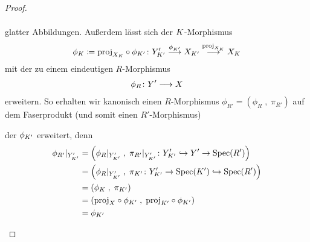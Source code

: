 \documentclass[german]{scrreprt}
\begin{document}
\begin{Satz}
\begin{proof}
\begin{enumerate}[label=(\roman*)]
\begin{description}
\begin{gather*}
        \end{gather*}
        glatter Abbildungen.
        Außerdem lässt sich der $K$-Morphismus
        \begin{gather*}
          \phi_{K} \coloneqq \text{proj}_{X_{K}}\circ\phi_{K'}
          \colon
          Y_{K'}' \overset{\phi_{K'}}{\longrightarrow} X_{K'}
          \overset{\text{proj}_{X_{K}}}{\longrightarrow} X_{K}
        \end{gather*}
        mit der \NAbbEig zu einem eindeutigen
        $R$-Morphismus
        \begin{gather*}
          \phi_R\colon Y'\longrightarrow X
        \end{gather*}
        erweitern.
        So erhalten wir kanonisch einen $R$-Morphismus
        $\phi_{R'} = (\phi_R\;,\;\pi_{R'})$ auf dem
        Faserprodukt (und somit einen $R'$-Morphismus)
        \begin{center}
        \end{center}
        der $\phi_{K'}$ erweitert, denn
        \begin{align*}
          \phi_{R'}|_{Y_{\K'}'}
          &= \left(
            \phi_R|_{Y_{\K'}'}\;,\;
            \pi_{R'}|_{Y_{\K'}'}\colon
            Y_{\K'}'\hookrightarrow Y'\to\Spec(R')
            \right)\\
          &= \left(
            \phi_R|_{Y_{\K'}'}\;,\;
            \pi_{\K'}\colon
            Y_{\K'}'\to \Spec(K')\hookrightarrow\Spec(R')
            \right)\\
          &= \left(
            \phi_{\K}\;,\; \pi_{\K'}
            \right)\\
          &= \left(
            \proj_X\circ\phi_{\K'}\;,\;
            \proj_{\K'}\circ\phi_{\K'}
            \right)\\
          &= \phi_{\K'}

\end{align*}
\end{description}
\end{enumerate}
\end{proof}
\end{Satz}
\end{document}
